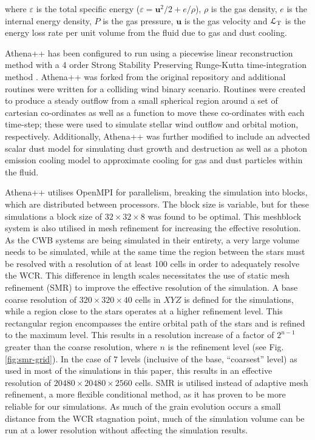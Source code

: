 \noindent
where $\varepsilon$ is the total specific energy ($\varepsilon = \boldsymbol{u}^2/2 + e/\rho $), $\rho$ is the gas density, $e$ is the internal energy density, $P$ is the gas pressure, $\boldsymbol{u}$ is the gas velocity and $\mathcal{L}_\text{T}$ is the energy loss rate per unit volume from the fluid due to gas and dust cooling.


Athena++ has been configured to run using a piecewise linear reconstruction method with a 4 order Strong Stability Preserving Runge-Kutta time-integration method \parencite{spiteriNewClassOptimal2002}.
Athena++ was forked from the original repository and additional routines were written for a colliding wind binary scenario.
Routines were created to produce a steady outflow from a small spherical region around a set of cartesian co-ordinates as well as a function to move these co-ordinates with each time-step; these were used to simulate stellar wind outflow and orbital motion, respectively.
Additionally, Athena++ was further modified to include an advected scalar dust model for simulating dust growth and destruction as well as a photon emission cooling model to approximate cooling for gas and dust particles within the fluid.

Athena++ utilises OpenMPI for parallelism, breaking the simulation into blocks, which are distributed between processors.
The block size is variable, but for these simulations a block size of $32\times 32 \times 8$ was found to be optimal.
This meshblock system is also utilised in mesh refinement for increasing the effective resolution.
As the CWB systems are being simulated in their entirety, a very large volume needs to be simulated, while at the same time the region between the stars must be resolved with a resolution of at least 100 cells in order to adequately resolve the WCR.
This difference in length scales necessitates the use of static mesh refinement (SMR) to improve the effective resolution of the simulation.
A base coarse resolution of $320 \times 320 \times 40$ cells in $XYZ$ is defined for the simulations, while a region close to the stars operates at a higher refinement level.
This rectangular region encompasses the entire orbital path of the stars and is refined to the maximum level.
This results in a resolution increase of a factor of $2^{n-1}$ greater than the coarse resolution, where $n$ is the refinement level (see Fig. \ref{fig:smr-grid}).
In the case of 7 levels (inclusive of the base, ``coarsest'' level) as used in most of the simulations in this paper, this results in an effective resolution of $20480 \times 20480 \times 2560$ cells.
SMR is utilised instead of adaptive mesh refinement, a more flexible conditional method, as it has proven to be more reliable for our simulations.
As much of the grain evolution occurs a small distance from the WCR stagnation point, much of the simulation volume can be run at a lower resolution without affecting the simulation results.

